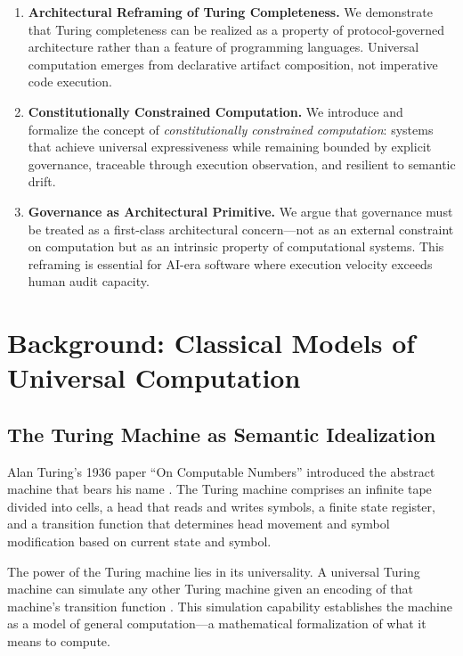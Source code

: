 \documentclass[11pt,a4paper]{article}
\begin{document}
\begin{enumerate}[nosep]
    \item \textbf{Architectural Reframing of Turing Completeness.} We demonstrate that Turing completeness can be realized as a property of protocol-governed architecture rather than a feature of programming languages. Universal computation emerges from declarative artifact composition, not imperative code execution.

    \item \textbf{Constitutionally Constrained Computation.} We introduce and formalize the concept of \emph{constitutionally constrained computation}: systems that achieve universal expressiveness while remaining bounded by explicit governance, traceable through execution observation, and resilient to semantic drift.

    \item \textbf{Governance as Architectural Primitive.} We argue that governance must be treated as a first-class architectural concern---not as an external constraint on computation but as an intrinsic property of computational systems. This reframing is essential for AI-era software where execution velocity exceeds human audit capacity.
\end{enumerate}



\section{Background: Classical Models of Universal Computation}
\label{sec:background}

\subsection{The Turing Machine as Semantic Idealization}

Alan Turing's 1936 paper ``On Computable Numbers'' introduced the abstract machine that bears his name \citep{turing1936computable}. The Turing machine comprises an infinite tape divided into cells, a head that reads and writes symbols, a finite state register, and a transition function that determines head movement and symbol modification based on current state and symbol.

The power of the Turing machine lies in its universality. A universal Turing machine can simulate any other Turing machine given an encoding of that machine's transition function \citep{minsky1967computation}. This simulation capability establishes the machine as a model of general computation---a mathematical formalization of what it means to compute.
\end{document}
